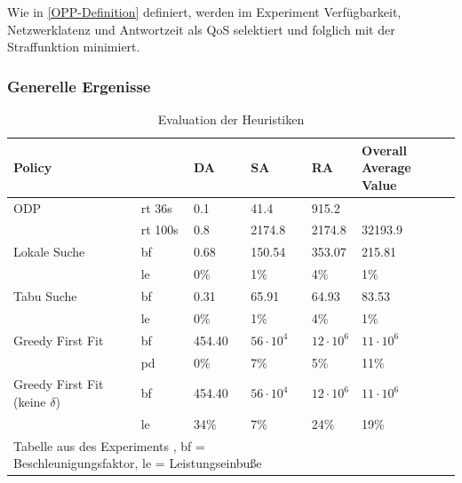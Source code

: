 \documentclass{article}
\begin{document}
Wie in \ref{OPP-Definition} definiert, werden im Experiment Verfügbarkeit, 
Netzwerklatenz und Antwortzeit als QoS selektiert und folglich mit der Straffunktion minimiert.




\subsubsection{Generelle Ergenisse}
\begin{table}[htbp]  
    \centering
    \caption{Evaluation der Heuristiken}
    \begin{tabular}{llllll}
    \toprule
    Policy                           &       & DA        & SA       & RA & Overall Average Value                  \\
    \midrule
    ODP                              &rt 36s &  0.1      & 41.4             & 915.2            &                  \\
                                     &rt 100s&  0.8      & 2174.8           & 2174.8           & 32193.9          \\
    \cmidrule{1-5}
    Lokale Suche                     &bf     &  0.68     & 150.54           & 353.07           & 215.81           \\
                                     &le     &0\%        & 1\%              &4\%               & 1\%              \\
    Tabu Suche                       &bf     &  0.31     & 65.91            & 64.93            & 83.53            \\
                                     &le     &0\%        & 1\%              &4\%               & 1\%              \\           
    Greedy First Fit                 &bf     &  454.40   & $56 \cdot 10^4$  & $12 \cdot 10^6$  & $11 \cdot 10^6$  \\
                                     &pd     &0\%        & 7\%              &5\%               &11\%              \\
    Greedy First Fit (keine $\delta$)&bf     &  454.40   & $56 \cdot 10^4$  & $12 \cdot 10^6$  & $11 \cdot 10^6$  \\
                                     &le     &34\%       & 7\%              &24\%              & 19\%             \\
    \bottomrule
    \multicolumn{4}{l}{\footnotesize Tabelle aus des Experiments \cite{efficient-operator-placement}, bf = Beschleunigungsfaktor, le = Leistungseinbuße}\\
    \end{tabular}
\end{table} \label{experiment-tabelle}
\end{document}
